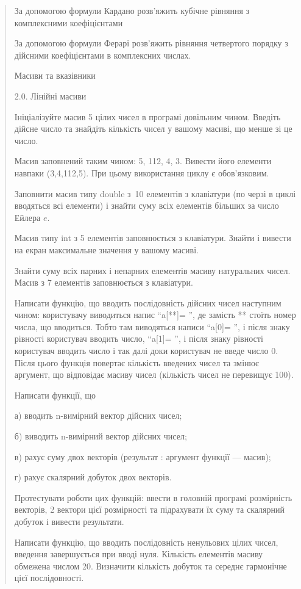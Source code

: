 \documentclass[]{article}
\begin{document}
\begin{quote}
За допомогою формули Кардано розв'яжить кубічне рівняння з комплексними
коефіцієнтами

За допомогою формули Ферарі розв'яжить рівняння четвертого порядку з
дійсними коефіцієнтами в комплексних числах.

Масиви та вказівники

2.0. Лінійні масиви

Ініціалізуйте масив 5 цілих чисел в програмі довільним чином. Введіть
дійсне число та знайдіть кількість чисел у вашому масиві, що менше зі це
число.

Масив заповнений таким чином: 5, 112, 4, 3. Вивести його елементи
навпаки (3,4,112,5). При цьому використання циклу є обов'язковим.

Заповнити масив типу double з~10 елементів з клавіатури (по черзі в
циклі вводяться всі елементи) і знайти суму всіх елементів більших за
число Ейлера \(e\).

Масив типу int з 5 елементів заповнюється з клавіатури. Знайти і вивести
на екран максимальне значення у вашому масиві.

Знайти суму всіх парних і непарних елементів масиву натуральних чисел.
Масив з 7 елементів заповнюється з клавіатури.

Написати функцію, що вводить послідовність дійсних чисел наступним
чином: користувачу виводиться напис ``a{[}**{]}= '', де замість **
стоїть номер числа, що вводиться. Тобто там виводяться написи
``a{[}0{]}= '', і після знаку рівності користувач вводить число,
``a{[}1{]}= '', і після знаку рівності користувач вводить число і так
далі доки користувач не введе число 0. Після цього функція повертає
кількість введених чисел та змінює аргумент, що відповідає масиву чисел
(кількість чисел не перевищує 100).

Написати функції, що

а) вводить n-вимірний вектор дійсних чисел;

б) виводить n-вимірний вектор дійсних чисел;

в) рахує суму двох векторів (результат : аргумент функції --- масив);

г) рахує скалярний добуток двох векторів.

Протестувати роботи цих функцій: ввести в головній програмі розмірність
векторів, 2 вектори цієї розмірності та підрахувати їх суму та скалярний
добуток і вивести результати.

Написати функцію, що вводить послідовність ненульових цілих чисел,
введення завершується при вводі нуля. Кількість елементів масиву
обмежена числом 20. Визначити кількість добуток та середнє гармонічне
цієї послідовності.


\end{quote}
\end{document}
